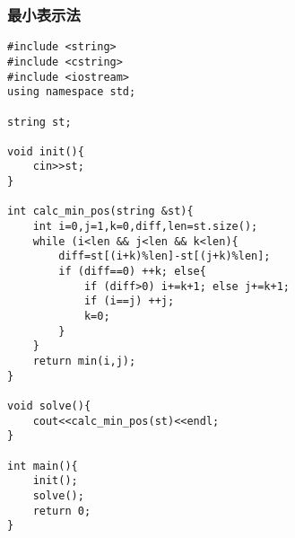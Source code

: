 \subsubsection{最小表示法}
\begin{verbatim}
#include <string>
#include <cstring>
#include <iostream>
using namespace std;

string st;

void init(){
    cin>>st;
}

int calc_min_pos(string &st){
    int i=0,j=1,k=0,diff,len=st.size();
    while (i<len && j<len && k<len){
        diff=st[(i+k)%len]-st[(j+k)%len];
        if (diff==0) ++k; else{
            if (diff>0) i+=k+1; else j+=k+1;
            if (i==j) ++j;
            k=0;
        }
    }
    return min(i,j);
}

void solve(){
    cout<<calc_min_pos(st)<<endl;
}

int main(){
    init();
    solve();
    return 0;
}

\end{verbatim}
